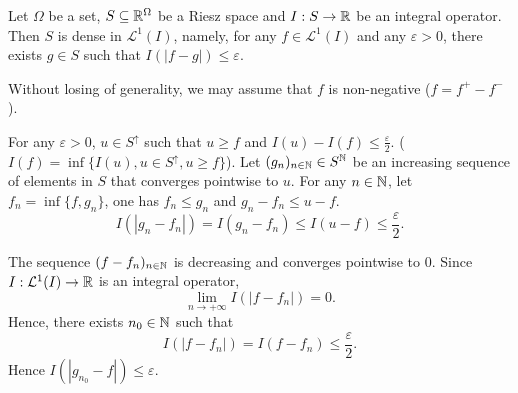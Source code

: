 \begin{lemmaenv}\label{lem:7.2.4}
    Let $\Omega$ be a set, $S \subseteq \mathbb{R}^\Omega$ be a Riesz space and $I : S \rightarrow \mathbb{R}$ be an integral operator.
    Then $S$ is dense in $\mathcal{L}^{1}(I)$,
    namely, for any $f \in \mathcal{L}^{1}(I)$ and any $\varepsilon > 0$,
    there exists $g \in S$ such that $I(|f - g|) \le \varepsilon$.
\end{lemmaenv}
\begin{proofenv}
    Without losing of generality, we may assume that $f$ is non-negative ($f = f^+ - f^-$).
    
    For any $\varepsilon > 0$, $u \in S^\uparrow$ such that $u \ge f$ and $I(u) - I(f) \le \frac{\varepsilon}{2}$.
    ($I(f) = \inf \{I(u), u\in S^\uparrow, u\ge f\}$).
    Let $(g_n)_{n \in \mathbb{N}} \in S^{\mathbb{N}}$ be an increasing sequence of elements in $S$ that converges pointwise to $u$.
    For any $n \in \mathbb{N}$, let $f_n = \inf\{f, g_n\}$,
    one has $f_n \le g_n$ and $g_n - f_n \le u - f$.
    $$I(|g_n - f_n|) = I(g_n - f_n) \le I(u - f) \le \frac{\varepsilon}{2}.$$

    The sequence $(f - f_n)_{n \in \mathbb{N}}$ is decreasing and converges pointwise to $0$.
    Since $I : \mathcal{L}^{1}(I) \rightarrow \mathbb{R}$ is an integral operator,
    $$\lim_{n \rightarrow +\infty} I(|f - f_n|) = 0.$$
    Hence, there exists $n_0 \in \mathbb{N}$ such that 
    $$I(|f - f_n|) = I(f - f_n) \le \frac{\varepsilon}{2}.$$
    Hence $I(|g_{n_0} - f|) \le \varepsilon$.
\end{proofenv}


